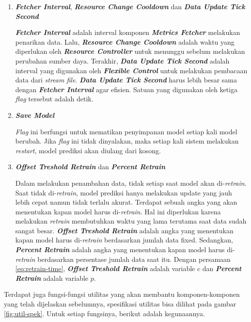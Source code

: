 \begin{enumerate}
  \item \textbf{\textit{Fetcher Interval}}, \textbf{\textit{Resource Change Cooldown}} dan \textbf{\textit{Data Update Tick Second}}

        \textbf{\textit{Fetcher Interval}} adalah interval komponen \textbf{\textit{Metrics Fetcher}} melakukan penarikan data. Lalu, \textbf{\textit{Resource Change Cooldown}} adalah waktu yang diperlukan oleh \textbf{\textit{Resource Controller}} untuk menunggu sebelum melakukan perubahan sumber daya. Terakhir, \textbf{\textit{Data Update Tick Second}} adalah interval yang digunakan oleh \textbf{\textit{Flexible Control}} untuk melakukan pembacaan data dari \textit{stream file}. \textbf{\textit{Data Update Tick Second}} harus lebih besar sama dengan \textbf{\textit{Fetcher Interval}} agar efisien. Satuan yang digunakan oleh ketiga \textit{flag} tersebut adalah detik.

  \item \textbf{\textit{Save Model}}

        \textit{Flag} ini berfungsi untuk mematikan penyimpanan model setiap kali model berubah. Jika \textit{flag} ini tidak dinyalakan, maka setiap kali sistem melakukan \textit{restart}, model prediksi akan diulang dari kosong.

  \item \textbf{\textit{Offset Treshold Retrain}} dan \textbf{\textit{Percent Retrain}}

        Dalam melakukan penambahan data, tidak setiap saat model akan di-\textit{retrain}. Saat tidak di-\textit{retrain}, model prediksi hanya melakukan update yang jauh lebih cepat namun tidak terlalu akurat. Terdapat sebuah angka yang akan menentukan kapan model harus di-\textit{retrain}. Hal ini diperlukan karena melakukan \textit{retrain} membutuhkan waktu yang lama terutama saat data sudah sangat besar. \textbf{\textit{Offset Treshold Retrain}} adalah angka yang menentukan kapan model harus di-\textit{retrain} berdasarkan jumlah data fixed. Sedangkan, \textbf{\textit{Percent Retrain}} adalah angka yang menentukan kapan model harus di-\textit{retrain} berdasarkan persentase jumlah data saat itu. Dengan persamaan \ref{eq:retrain-time}, \textbf{\textit{Offset Treshold Retrain}} adalah variable $c$ dan \textbf{\textit{Percent Retrain}} adalah variable $p$.
\end{enumerate}

Terdapat juga fungsi-fungsi utilitas yang akan membantu komponen-komponen yang telah dijelaskan sebelumnya, spesifikasi utilitas bisa dilihat pada gambar \ref{fig:util-spek}. Untuk setiap fungsinya, berikut adalah kegunaannya.


